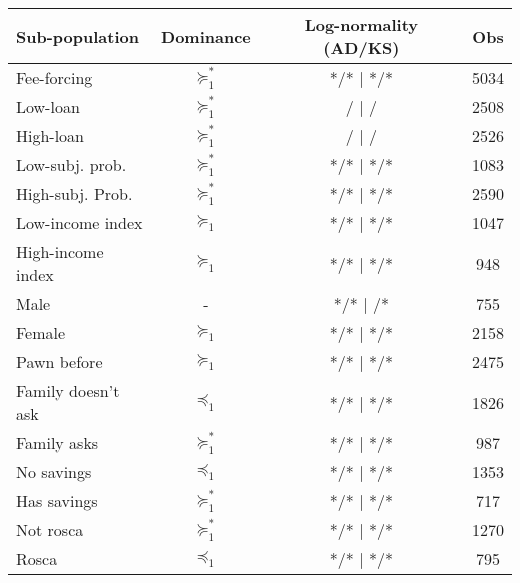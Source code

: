 \begin{tabular}{lccc}
\toprule
Sub-population & Dominance & Log-normality (AD/KS) & Obs \\
\midrule
\midrule
Fee-forcing & \cellcolor[rgb]{ .557,  .663,  .859} $\succeq_{1}^*$ & */*  |  */* & 5034 \\
Low-loan & $\succeq_{1}^*$ &    /     |     /    & 2508 \\
High-loan & $\succeq_{1}^*$ &    /     |     /    & 2526 \\
Low-subj. prob. & \cellcolor[rgb]{ .557,  .663,  .859} $\succeq_{1}^*$ & */*  |  */* & 1083 \\
High-subj. Prob. & \cellcolor[rgb]{ .557,  .663,  .859} $\succeq_{1}^*$ & */*  |  */* & 2590 \\
Low-income index & \cellcolor[rgb]{ .851,  .882,  .949} $\succeq_{1}$ & */*  |  */* & 1047 \\
High-income index & \cellcolor[rgb]{ .851,  .882,  .949} $\succeq_{1}$ & */*  |  */* & 948 \\
Male  & -     & */*  |     /* & 755 \\
Female & \cellcolor[rgb]{ .851,  .882,  .949} $\succeq_{1}$ & */*  |  */* & 2158 \\
Pawn before & \cellcolor[rgb]{ .851,  .882,  .949} $\succeq_{1}$ & */*  |  */* & 2475 \\
Family doesn't ask & $\preceq_{1}$ & */*  |  */* & 1826 \\
Family asks & \cellcolor[rgb]{ .557,  .663,  .859} $\succeq_{1}^*$ & */*  |  */* & 987 \\
No savings & $\preceq_{1}$ & */*  |  */* & 1353 \\
Has savings & \cellcolor[rgb]{ .557,  .663,  .859} $\succeq_{1}^*$ & */*  |  */* & 717 \\
Not rosca & \cellcolor[rgb]{ .557,  .663,  .859} $\succeq_{1}^*$ & */*  |  */* & 1270 \\
Rosca & $\preceq_{1}$ & */*  |  */* & 795 \\

\end{tabular}
